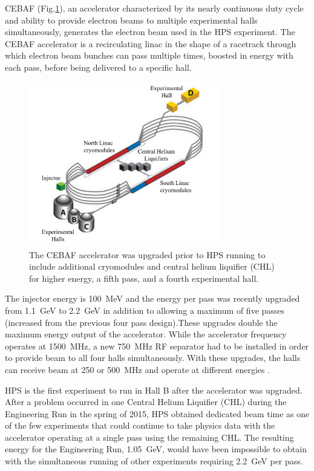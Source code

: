 CEBAF (Fig.\ref{Figure:cebaf}), an accelerator characterized by its nearly continuous duty cycle and ability to provide electron beams to multiple experimental halls simultaneously, generates the electron beam used in the HPS experiment. The CEBAF accelerator is a recirculating linac in the shape of a racetrack through which electron beam bunches can pass multiple times, boosted in energy with each pass, before being delivered to a specific hall. 

\begin{figure}[H]
  \centering
      \includegraphics[width=0.75\textwidth]{pics/experiment/cebafLabel.png}
  \caption[CEBAF accelerator]{The CEBAF accelerator was upgraded prior to HPS running to include additional cryomodules and central helium liquifier (CHL) for higher energy, a fifth pass, and a fourth experimental hall.}
  \label{Figure:cebaf}
\end{figure}

The injector energy is 100~MeV and the energy per pass was recently upgraded from 1.1~GeV to 2.2~GeV in addition to allowing a maximum of five passes (increased from the previous four pass design).These upgrades double the maximum energy output of the accelerator. While the accelerator frequency operates at 1500~MHz, a new 750~MHz RF separator had to be installed in order to provide beam to all four halls simultaneously. With these upgrades, the halls can receive beam at 250 or 500~MHz and operate at different energies \cite{kazimi}. 

HPS is the first experiment to run in Hall B after the accelerator was upgraded. After a problem occurred in one Central Helium Liquifier (CHL) during the Engineering Run in the spring of 2015, HPS obtained dedicated beam time as one of the few experiments that could continue to take physics data with the accelerator operating at a single pass using the remaining CHL. The resulting energy for the Engineering Run, 1.05~GeV, would have been impossible to obtain with the simultaneous running of other experiments requiring 2.2~GeV per pass.  

